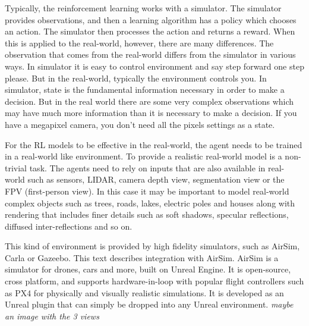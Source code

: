 \documentclass{article}
\begin{document}
Typically, the reinforcement learning works with a simulator. The simulator provides observations, and then a learning algorithm has a policy which chooses an action. The simulator then processes the action and returns a reward. When this is applied to the real-world, however, there are many differences. The observation that comes from the real-world differs from the simulator in various ways. In simulator it is easy to control environment and say step forward one step please. But in the real-world, typically the environment controls you. In simulator, state is the fundamental information necessary in order to make a decision. But in the real world there are some very complex observations which may have much more information than it is necessary to make a decision. If you have a megapixel camera, you don't need all the pixels settings as a state. \cite{real-world-bandits}

For the RL models to be effective in the real-world, the agent needs to be trained in a real-world like environment. To provide a realistic real-world model is a non-trivial task. The agents need to rely on inputs that are also available in real-world such as sensors, LIDAR, camera depth view, segmentation view or the FPV (first-person view). In this case it may be important to model real-world complex objects such as trees, roads, lakes, electric poles and houses along with rendering that includes finer details such as soft shadows, specular reflections, diffused inter-reflections and so on. \cite{shah2018airsim}

This kind of environment is provided by high fidelity simulators, such as AirSim, Carla or Gazeebo. This text describes integration with AirSim. AirSim is a simulator for drones, cars and more, built on Unreal Engine. It is open-source, cross platform, and supports hardware-in-loop with popular flight controllers such as PX4 for physically and visually realistic simulations. It is developed as an Unreal plugin that can simply be dropped into any Unreal environment. \cite{shah2018airsim}
\emph{maybe an image with the 3 views}

\end{document}

